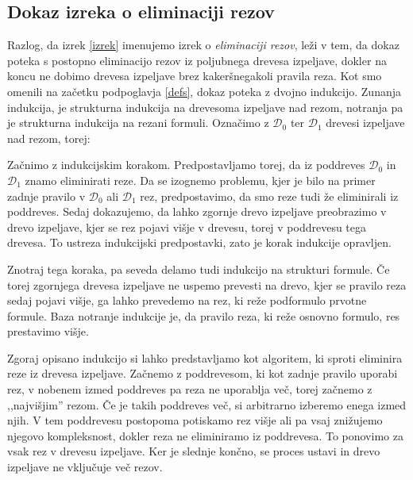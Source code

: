 \subsection{Dokaz izreka o eliminaciji rezov}

Razlog, da izrek \ref{izrek} imenujemo izrek o \emph{eliminaciji rezov}, leži v tem, da dokaz poteka s postopno eliminacijo rezov iz poljubnega drevesa izpeljave, dokler na koncu ne dobimo drevesa izpeljave brez kakeršnegakoli pravila reza. Kot smo omenili na začetku podpoglavja \ref{defs}, dokaz poteka z dvojno indukcijo. Zunanja indukcija, je strukturna indukcija na drevesoma izpeljave nad rezom, notranja pa je strukturna indukcija na rezani formuli. Označimo z $\mathcal{D}_0$ ter $\mathcal{D}_1$ drevesi izpeljave nad rezom, torej:
\begin{prooftree}
\end{prooftree}

Začnimo z indukcijskim korakom. Predpostavljamo torej, da iz poddreves $\mathcal{D}_0$ in $\mathcal{D}_1$ znamo eliminirati reze. Da se izognemo problemu, kjer je bilo na primer zadnje pravilo v $\mathcal{D}_0$ ali $\mathcal{D}_1$ rez, predpostavimo, da smo reze tudi že eliminirali iz poddreves. Sedaj dokazujemo, da lahko zgornje drevo izpeljave preobrazimo v drevo izpeljave, kjer se rez pojavi višje v drevesu, torej v poddrevesu tega drevesa. To ustreza indukcijski predpostavki, zato je korak indukcije opravljen.

Znotraj tega koraka, pa seveda delamo tudi indukcijo na strukturi formule. Če torej zgornjega drevesa izpeljave ne uspemo prevesti na drevo, kjer se pravilo reza sedaj pojavi višje, ga lahko prevedemo na rez, ki reže podformulo prvotne formule. Baza notranje indukcije je, da pravilo reza, ki reže osnovno formulo, res prestavimo višje.

\begin{opomba}
    Zgoraj opisano indukcijo si lahko predstavljamo kot algoritem, ki sproti eliminira reze iz drevesa izpeljave. Začnemo z poddrevesom, ki kot zadnje pravilo uporabi rez, v nobenem izmed poddreves pa reza ne uporablja več, torej začnemo z ,,najvišjim'' rezom. Če je takih poddreves več, si arbitrarno izberemo enega izmed njih. V tem poddrevesu postopoma potiskamo rez višje ali pa vsaj znižujemo njegovo kompleksnost, dokler reza ne eliminiramo iz poddrevesa. To ponovimo za vsak rez v drevesu izpeljave. Ker je slednje končno, se proces ustavi in drevo izpeljave ne vključuje več rezov.
\end{opomba}

